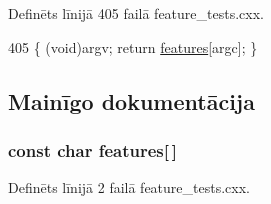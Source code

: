 Definēts līnijā 405 failā feature\+\_\+tests.\+cxx.


\begin{DoxyCode}
405 \{ (void)argv; \textcolor{keywordflow}{return} \hyperlink{build_2_c_make_files_2feature__tests_8cxx_a1582568e32f689337602a16bf8a5bff0}{features}[argc]; \}
\end{DoxyCode}


\subsection{Mainīgo dokumentācija}
\subsubsection[{\texorpdfstring{features}{features}}]{\setlength{\rightskip}{0pt plus 5cm}const char features\mbox{[}$\,$\mbox{]}}\hypertarget{cmake-build-release_2_c_make_files_2feature__tests_8cxx_a1582568e32f689337602a16bf8a5bff0}{}\label{cmake-build-release_2_c_make_files_2feature__tests_8cxx_a1582568e32f689337602a16bf8a5bff0}


Definēts līnijā 2 failā feature\+\_\+tests.\+cxx.

